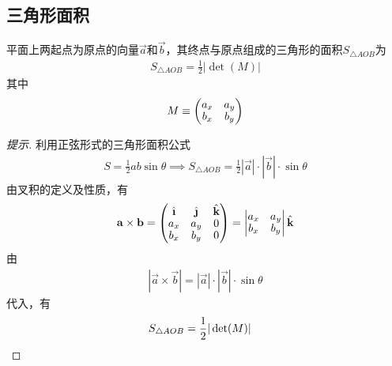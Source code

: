 \subsection{三角形面积}
\label{sec:area-of-triangle-by-vector}

\begin{lemma}
  平面上两起点为原点的向量$\vec a$和$\vec b$，其终点与原点组成的三角形的面积$S_{\triangle AOB}$为
  \begin{align*}
    S_{\triangle AOB} = \frac12\left| \det(M) \right|
  \end{align*}
  其中
  \begin{align*}\renewcommand{\arraystretch}{.9}
    M\equiv\begin{pmatrix}a_x & a_y\\ b_x & b_y\end{pmatrix}
  \end{align*}

  \centering
\end{lemma}
\begin{proof}[提示]利用正弦形式的三角形面积公式
  \begin{align*}
    S=\frac12 ab\sin\theta\implies
    S_{\triangle AOB} = \frac12 |\vec a| \cdot |\vec b| \cdot \sin\theta
  \end{align*}
  由叉积的定义及性质，有
  \begin{align*}\renewcommand{\arraystretch}{.9}
    \vec a\times \vec b = 
    \begin{pmatrix}
      \ihat & \jhat & \khat\\
      a_x   & a_y   & 0\\
      b_x   & b_y   & 0
    \end{pmatrix} =
    \begin{vmatrix}
      a_x   & a_y\\
      b_x   & b_y
    \end{vmatrix}\khat
  \end{align*}
  由
  \begin{align*}
    \left|\vec a\times \vec b\right| = |\vec a|\cdot|\vec b|\cdot\sin\theta
  \end{align*}
  代入，有
  \begin{align*}
    S_{\triangle AOB} = \frac12 |\det(M)|&\qedhere
  \end{align*}
\end{proof}

